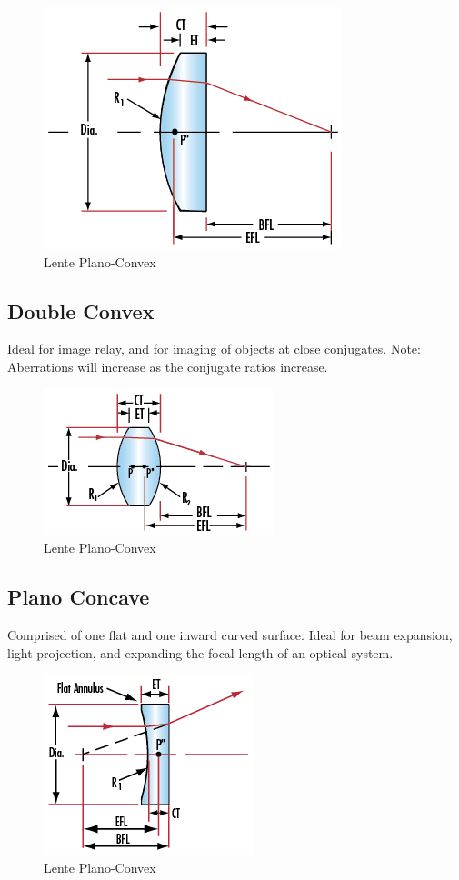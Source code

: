\begin{figure}[!ht]
\centering

\includegraphics[width=.3\textwidth]{img/plano-convex.png}

\caption{Lente Plano-Convex}
\label{fig:ccd-blockdiagram}
\end{figure}


\subsection{Double Convex}

Ideal for image relay, and for imaging of objects at close conjugates. Note:
Aberrations will increase as the conjugate ratios increase.

\begin{figure}[!ht]
\centering

\includegraphics[width=.3\textwidth]{img/double-convex.png}

\caption{Lente Plano-Convex}
\label{fig:ccd-blockdiagram}
\end{figure}

\subsection{Plano Concave}
Comprised of one flat and one inward curved surface. Ideal for beam expansion, light projection, and expanding the focal length of an optical system. 

\begin{figure}[!ht]
\centering

\includegraphics[width=.3\textwidth]{img/plano-concave.png}

\caption{Lente Plano-Convex}
\label{fig:ccd-blockdiagram}
\end{figure}


